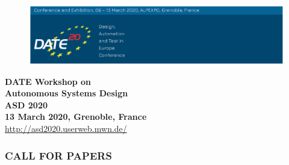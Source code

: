 \documentclass[a4paper,10pt] {article}
\begin{document}
\begin{figure}
\hspace{-0.5cm}
  \includegraphics[scale=0.5]{images/header3.png}
\end{figure}


\begin{center}

\Large{\textbf{DATE Workshop on}} \\ \LARGE{\textbf{Autonomous Systems Design \\ASD 2020}}   \\ \vspace{+0.3 cm}
\large{{\textbf{13 March 2020, Grenoble, France }}} \\ \vspace{+0.2 cm}\small{{\url{http://asd2020.userweb.mwn.de/}}}
\end{center}

%

\subsubsection*{CALL FOR PAPERS}

\end{document}
